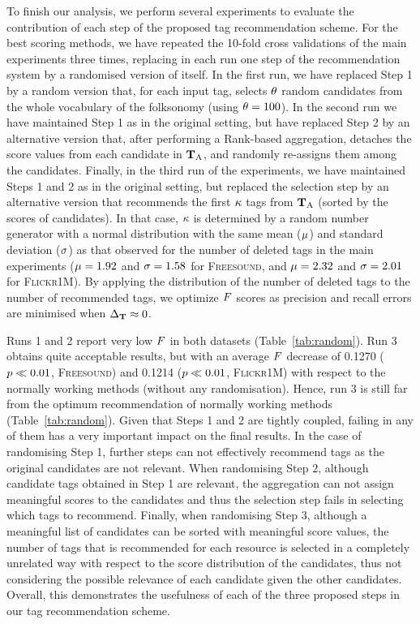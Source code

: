 To finish our analysis, we perform several experiments to evaluate the contribution of each step of the proposed tag recommendation scheme. For the best scoring methods, we have repeated the 10-fold cross validations of the main experiments three times, replacing in each run one step of the recommendation system by a randomised version of itself.
In the first run, we have replaced Step 1 by a random version that, for each input tag, selects $\theta$ random candidates from the whole vocabulary of the folksonomy (using $\theta=100$). 
In the second run we have maintained Step 1 as in the original setting, but have replaced Step 2 by an alternative version that, after performing a Rank-based aggregation, detaches the score values from each candidate in $\mathbf{T}_{\text{A}}$, and randomly re-assigns them among the candidates. 
Finally, in the third run of the experiments, we have maintained Steps 1 and 2 as in the original setting, but replaced the selection step by an alternative version that recommends the first $\kappa$ tags from $\mathbf{T}_{\text{A}}$ (sorted by the scores of candidates). In that case, $\kappa$ is determined by a random number generator with a normal distribution with the same mean ($\mu$) and standard deviation ($\sigma$) as that observed for the number of deleted tags in the main experiments ($\mu = 1.92$ and $\sigma = 1.58$ for \textsc{Freesound}, and $\mu = 2.32$ and $\sigma = 2.01$ for \textsc{Flickr1M}). By applying the distribution of the number of deleted tags to the number of recommended tags, we optimize $F$ scores as precision and recall errors are minimised when $\Delta_{\mathbf{T}} \approx 0$.

Runs 1 and 2 report very low $F$ in both datasets (Table~\ref{tab:random}). Run 3 obtains quite acceptable results, but with an average $F$ decrease of 0.1270 ($p\ll0.01$, \textsc{Freesound}) and 0.1214 ($p\ll0.01$, \textsc{Flickr1M}) with respect to the normally working methods (without any randomisation). Hence, run 3 is still far from the optimum recommendation of normally working methods (Table~\ref{tab:random}). Given that Steps 1 and 2 are tightly coupled, failing in any of them has a very important impact on the final results. In the case of randomising Step 1, further steps can not effectively recommend tags as the original candidates are not relevant. When randomising Step 2, although candidate tags obtained in Step 1 are relevant, the aggregation can not assign meaningful scores to the candidates and thus the selection step fails in selecting which tags to recommend. Finally, when randomising Step 3, although a meaningful list of candidates can be sorted with meaningful score 
values, the number of tags that is recommended for each resource is selected in a completely unrelated way with respect to the score distribution of the candidates, thus not considering the possible relevance of each candidate given the other candidates. Overall, this demonstrates the usefulness of each of the three proposed steps in our tag recommendation scheme.

